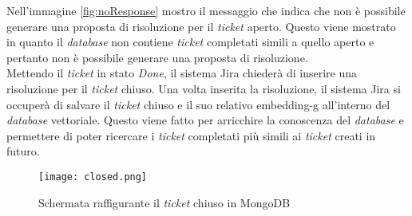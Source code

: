 \noindent
Nell'immagine \ref{fig:noResponse} mostro il messaggio che indica che non è possibile generare una proposta di risoluzione per il \textit{ticket} aperto. Questo viene mostrato in quanto il \textit{database} non contiene \textit{ticket} completati simili a quello aperto e pertanto non è possibile generare una proposta di risoluzione.\\
Mettendo il \textit{ticket} in stato \textit{Done}, il sistema Jira chiederà di inserire una risoluzione per il \textit{ticket} chiuso. Una volta inserita la risoluzione, il sistema Jira si occuperà di salvare il \textit{ticket} chiuso e il suo relativo \gls{embedding-g} all'interno del \textit{database} vettoriale. Questo viene fatto per arricchire la conoscenza del \textit{database} e permettere di poter ricercare i \textit{ticket} completati più simili ai \textit{ticket} creati in futuro.
\begin{figure}[H]
    \centering
    \texttt{[image: closed.png]}
    \caption{Schermata raffigurante il \textit{ticket} chiuso in MongoDB}
    \label{fig:closeIssue}
\end{figure}



